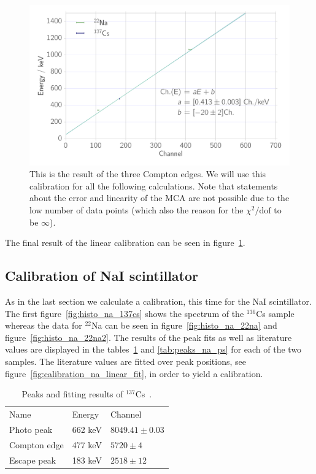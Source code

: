 \begin{figure}[htpb]
    \centering
    \includegraphics[width=0.9\linewidth]{./analysis/figures/calibration_ps_linear_fit}
    \caption{This is the result of the three Compton edges. We will use this calibration
    for all the following calculations. Note that statements about the error and linearity of the MCA 
    are not possible due to the low number of data points (which also the reason for
the $\chi^2/\mathrm{dof}$ to be $\infty$).}
\label{fig:calibration_ps_linear_fit}
\end{figure}
The final result of the linear calibration can be seen in
figure~\ref{fig:calibration_ps_linear_fit}.

\subsection{Calibration of NaI scintillator}

\label{sub:calibration_of_na_scintillator}
As in the last section we calculate a calibration, this time for the NaI scintillator. The
first figure~\ref{fig:histo_na_137cs} shows the spectrum of the $^{136}$Cs sample 
whereas the data for
$^{22}$Na can be seen in figure~\ref{fig:histo_na_22na} and figure~\ref{fig:histo_na_22na2}.
The results of the peak fits as well as literature values are displayed in the tables~\ref{tab:peaks_cs_ps}
and \ref{tab:peaks_na_ps} for each of the two samples. The literature values are fitted over peak positions, see 
figure~\ref{fig:calibration_na_linear_fit}, in order to yield a calibration. 
\begin{table}[htpb]
    \centering
    \caption{Peaks and fitting results of $^{137}$Cs~\cite{nist}.}
\label{tab:peaks_cs_ps}
    \begin{tabular}{lll}
        \rowcolor{LightCyan} Name &Energy & Channel \\ 
        Photo peak & 662 keV & $8049.41 \pm 0.03$\\ 
        Compton edge & 477 keV & $5720 \pm 4$\\  
        Escape peak & 183 keV & $2518 \pm 12$
    \end{tabular}
\end{table}

